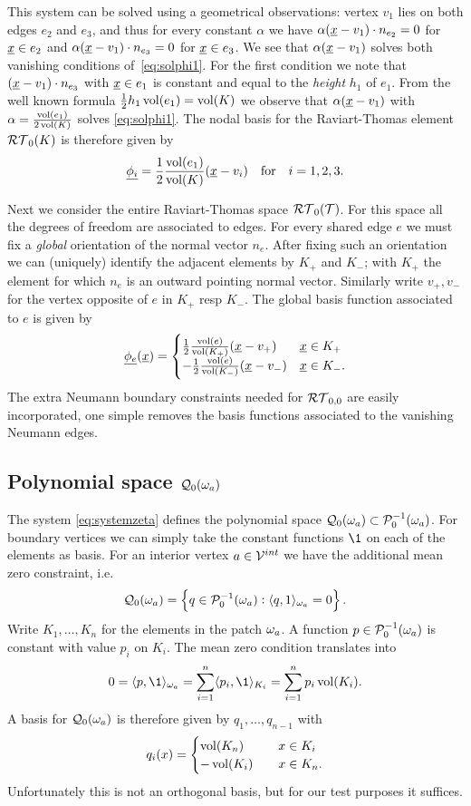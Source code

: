 \documentclass[thesis.tex]{subfiles}
\begin{document}
This system can be solved using a geometrical observations:
vertex $v_1$ lies on both edges $e_2$ and $e_3$, and thus for every constant $\alpha$  we have $\alpha(\underline{x} - v_1) \cdot n_{e_2} = 0$ for
$\underline{x} \in e_2$ and $\alpha(\underline{x} - v_1) \cdot  n_{e_3} = 0$ for $\underline{x} \in e_3$.
We see that $\alpha(\underline{x} - v_1)$ solves both vanishing conditions of~\eqref{eq:solphi1}.
For the first condition we note that $(\underline{x} - v_1) \cdot n_{e_3}$ with $\underline{x} \in e_1$ is constant and equal to the \emph{height} $h_1$ 
of $e_1$. From the well known formula $\frac{1}{2} h_1 \operatorname{vol}(e_1) = \operatorname{vol}(K)$
we observe that $\alpha(\underline{x} - v_1)$ with $\alpha = \frac{\operatorname{vol}(e_1)}{2\operatorname{vol}(K)}$ solves \eqref{eq:solphi1}. 
The nodal basis for the Raviart-Thomas element $\mathcal{RT}_0(K)$ is therefore given by
\[
  \underline{\phi_i} = \frac{1}{2}\frac{\operatorname{vol}(e_1)}{\operatorname{vol}(K)}( \underline{x} - v_i) \quad \text{for} \quad i=1,2,3.
\]

Next we consider the entire Raviart-Thomas space $\mathcal{RT}_0(\mathcal{T})$. For this space all the degrees of freedom are associated
to edges. For every shared edge $e$ we must fix a \emph{global} orientation of the normal vector $n_e$.
After fixing such an orientation we can (uniquely) identify the adjacent elements by $K_+$ and $K_-$; with $K_+$ the element for which $n_e$
is an outward pointing normal vector. Similarly write $v_+, v_-$ for the vertex opposite of $e$ in $K_+$ resp $K_-$. The
global basis function associated to $e$ is given by
\begin{equation}
  \label{eq:basisrt0}
  \underline{\phi_e}(\underline{x}) = \begin{cases}
    \frac{1}{2}\frac{\operatorname{vol}(e)}{\operatorname{vol}(K_+)}( \underline{x} - v_+) & \underline{x} \in K_+\\
    - \frac{1}{2}\frac{\operatorname{vol}(e)}{\operatorname{vol}(K_-)}( \underline{x} - v_-) & \underline{x} \in K_-.
\end{cases}
\end{equation}
The extra Neumann boundary constraints needed for $\mathcal{RT}_{0,0}$ are easily incorporated, one simple removes the
basis functions associated to the vanishing Neumann edges. 
\subsection{Polynomial space $\mathcal{Q}_0(\omega_a)$}
The system \eqref{eq:systemzeta} defines the polynomial space $\mathcal{Q}_0(\omega_a) \subset \mathcal{P}_0^{-1}(\omega_a)$. For boundary
vertices we can simply take the constant functions $\1$ on each of the elements as basis. For an interior vertex $a \in \mathcal{V}^{int}$
we have the additional mean zero constraint, i.e.
\[
  \mathcal{Q}_0(\omega_a) = \set{q \in \mathcal{P}_0^{-1}(\omega_a) :  \langle q,1 \rangle_{\omega_a} = 0}.
\]
Write $K_1,\dots, K_n$ for the elements in the patch $\omega_a$. A function $p \in \mathcal{P}_0^{-1}(\omega_a)$ is constant
with value $p_i$ on $K_i$. The mean zero condition translates into
\[
  0 = \ip{p,\1}_{\w_a} = \sum_{i =1}^n \ip{p_i, \1}_{K_i} = \sum_{i=1}^n p_i \vol(K_i).
\]
A basis for $\mathcal{Q}_0(\omega_a)$ is therefore given by $q_1, \dots, q_{n-1}$ with
\[
  q_i(x) = \begin{cases}
    \operatorname{vol}(K_n) & \quad x \in K_i\\
    -\operatorname{vol}(K_i) & \quad x \in K_n.
  \end{cases}
\]
Unfortunately this is not an orthogonal basis, but for our test purposes it suffices.
\end{document}
